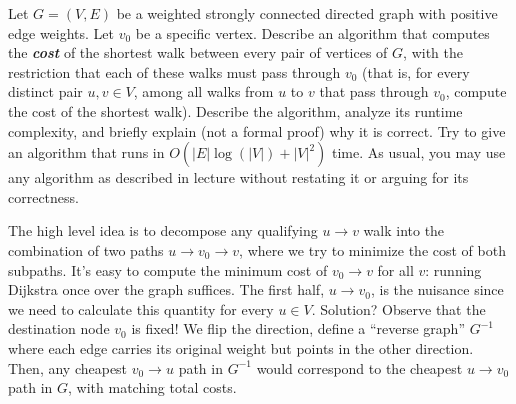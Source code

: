  \begin{exercise}
    Let $G = (V,E)$ be a weighted strongly connected directed graph with positive edge weights. Let $v_0$ be a specific vertex. Describe an algorithm that computes the \textbf{\textit{cost}} of the shortest walk between every pair of vertices of $G$, with the restriction that each of these walks must pass through $v_0$ (that is, for every distinct pair $u, v \in V$, among all walks from $u$ to $v$ that pass through $v_0$, compute the cost of the shortest walk). Describe the algorithm, analyze its runtime complexity, and briefly explain (not a formal proof) why it is correct. Try to give an algorithm that runs in $O (|E|\log(|V|) + |V|^2)$ time. As usual, you may use any algorithm as described in lecture without restating it or arguing for its correctness.
  \end{exercise}
  \begin{solution}
    The high level idea is to decompose any qualifying $u\to v$ walk into the combination of two paths $u\to v_0\to v$, where we try to minimize the cost of both subpaths. It's easy to compute the minimum cost of $v_0\to v$ for all $v$: running Dijkstra once over the graph suffices. The first half, $u\to v_0$, is the nuisance since we need to calculate this quantity for every $u\in V$. Solution? Observe that the destination node $v_0$ is fixed! We flip the direction, define a ``reverse graph'' $G^{-1}$ where each edge carries its original weight but points in the other direction. Then, any cheapest $v_0\to u$ path in $G^{-1}$ would correspond to the cheapest $u\to v_0$ path in $G$, with matching total costs.  
  \end{solution}

